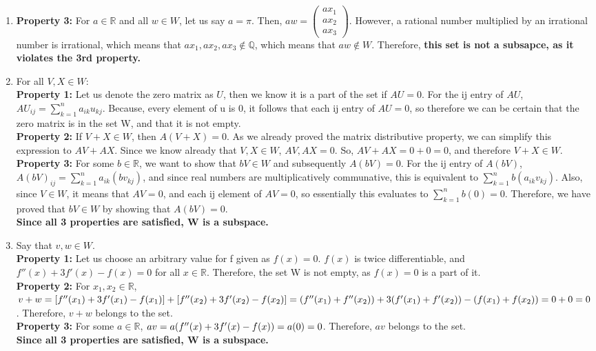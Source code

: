 \documentclass{article}
\begin{document}
\begin{enumerate}
\begin{enumerate}
\item \textbf{Property 3:} For $a \in \mathbb{R}$ and all $w \in W$, let us say $a = \pi$. Then, $a w = \left(\begin{array}{c} ax_1\\ax_2\\ax_3 \end{array} \right)$. However, a rational number multiplied by an irrational number is irrational, which means that $ax_1, ax_2, ax_3 \notin \mathbb{Q}$, which means that $a w \notin W$. Therefore, \textbf{this set is not a subsapce, as it violates the 3rd property.}

\item For all $V,X \in W$:\\
\textbf{Property 1:} Let us denote the zero matrix as $U$, then we know it is a part of the set if $A U = 0$. For the ij entry of $AU$, $AU_{ij} = \sum\limits_{k = 1}^n a_{ik}u_{kj}$. Because, every element of u is 0, it follows that each ij entry of $AU = 0$, so therefore we can be certain that the zero matrix is in the set W, and that it is not empty. \\ 
\textbf{Property 2:} If $V+X \in W$, then $A(V + X) = 0$. As we already proved the matrix distributive property, we can simplify this expression to $AV + AX$. Since we know already that $V,X \in W$, $AV, AX = 0$. So, $AV + AX = 0 + 0 = 0$, and therefore $V+X \in W$. \\
\textbf{Property 3:} For some $b \in \mathbb{R}$, we want to show that $b V \in W$ and subsequently $A(bV) = 0$. For the ij entry of $A(bV)$,  $A(bV)_{ij} = \sum\limits_{k = 1}^n a_{ik}(bv_{kj})$, and since real numbers are multiplicatively communative, this is equivalent to  $\sum\limits_{k = 1}^n b(a_{ik}v_{kj})$. Also, since $V \in W$, it means that $AV = 0$, and each ij element of $AV = 0$, so essentially this evaluates to $\sum\limits_{k = 1}^n b(0) = 0$. Therefore, we have proved that $b V \in W$ by showing that $A (b V) = 0$. \\ \textbf{Since all 3 properties are satisfied, W is a subspace.}


\item Say that $v,w \in W$.\\
\textbf{Property 1:} Let us choose an arbitrary value for f given as $f(x) = 0$. $f(x)$ is twice differentiable, and $f''(x) + 3f'(x) - f(x) = 0$ for all $x \in \mathbb{R}$. Therefore, the set W is not empty, as $f(x) = 0$ is a part of it. \\
\textbf{Property 2:} For $x_1, x_2 \in \mathbb{R}$, $v + w \\= [f''(x_1) + 3f'(x_1) - f(x_1)] + [f''(x_2) + 3f'(x_2) - f(x_2)] \\= (f''(x_1) + f''(x_2)) + 3(f'(x_1) + f'(x_2)) - (f(x_1) + f(x_2)) = 0  + 0 = 0$. Therefore, $v + w$ belongs to the set.\\
\textbf{Property 3:} For some $a \in \mathbb{R}$, $a v \\ = a ( f''(x) + 3 f'(x) - f(x) ) = a (0) = 0$. Therefore, $a v$ belongs to the set. \\
\textbf{Since all 3 properties are satisfied, W is a subspace.}


\end{enumerate}
\end{enumerate}
\end{document}
